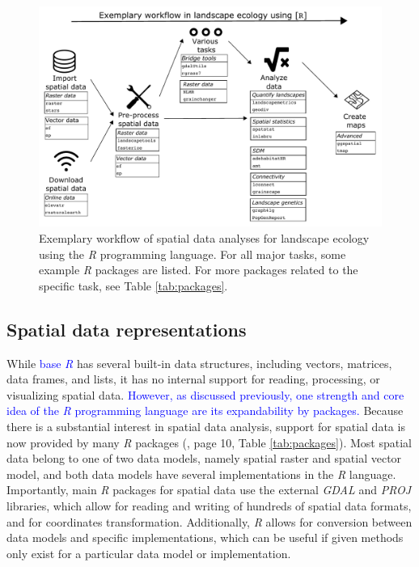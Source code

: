 \documentclass[smallextended]{svjour3}       %
\begin{document}
\begin{figure}
\includegraphics[width=\linewidth]{data/Figure_1} \caption{Exemplary workflow of spatial data analyses for landscape ecology using the \textit{R} programming language. For all major tasks, some example \textit{R} packages are listed. For more packages related to the specific task, see Table \ref{tab:packages}.}\label{fig:fig-workflow}
\end{figure}

\hypertarget{sec:spatrep}{%
\subsection{Spatial data representations}\label{sec:spatrep}}

While \textcolor{blue}{base \textit{R}} has several built-in data structures, including vectors, matrices, data frames, and lists, it has no internal support for reading, processing, or visualizing spatial data.
\textcolor{blue}{However, as discussed previously, one strength and core idea of the \textit{R} programming language are its expandability by packages.}
Because there is a substantial interest in spatial data analysis, support for spatial data is now provided by many \textit{R} packages (\cite{Lovelace2019}, page 10, Table \ref{tab:packages}).
Most spatial data belong to one of two data models, namely spatial raster and spatial vector model, and both data models have several implementations in the \textit{R} language.
Importantly, main \textit{R} packages for spatial data use the external \textit{GDAL} \cite{GDAL/OGRcontributors2020} and \textit{PROJ} \cite{PROJcontributors2021} libraries, which allow for reading and writing of hundreds of spatial data formats, and for coordinates transformation.
Additionally, \textit{R} allows for conversion between data models and specific implementations, which can be useful if given methods only exist for a particular data model or implementation.
\end{document}

